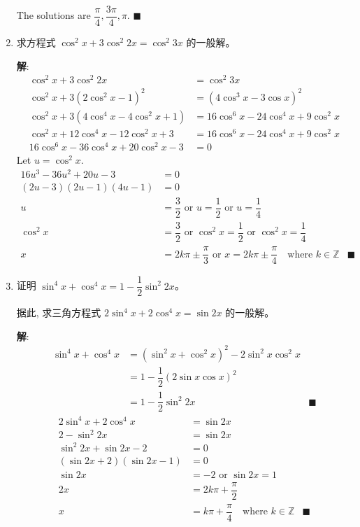 \documentclass{report}
\newcommand{\sol}{\vspace{0.2cm}\textbf{解}:}
\begin{document}
\begin{enumerate}[leftmargin=*]
    The solutions are $\dfrac{\pi}{4}, \dfrac{3\pi}{4}, \pi$. \hfill $\blacksquare$

    \newpage
    \item 求方程式 $\cos ^2 x+3 \cos ^2 2 x=\cos ^2 3 x$ 的一般解。
    
    \sol{}
    \begin{align*}
        \cos ^2 x+3 \cos ^2 2 x &= \cos ^2 3 x\\
        \cos ^2 x+3(2\cos^2 x - 1)^2 &= (4\cos^3 x - 3\cos x)^2\\
        \cos ^2 x+3(4\cos^4 x - 4\cos^2 x + 1) &= 16\cos^6 x - 24\cos^4 x + 9\cos^2 x\\
        \cos ^2 x+12\cos^4 x - 12\cos^2 x + 3 &= 16\cos^6 x - 24\cos^4 x + 9\cos^2 x\\
        16\cos^6 x - 36\cos^4 x + 20\cos^2 x - 3 &= 0
    \end{align*}
    Let $u = \cos^2 x$.
    \begin{align*}
        16u^3 - 36u^2 + 20u - 3 &= 0\\
        (2u - 3)(2u - 1)(4u - 1) &= 0\\
        u &= \dfrac{3}{2} \text{ or } u = \dfrac{1}{2} \text{ or } u = \dfrac{1}{4}\\
        \cos^2 x &= \dfrac{3}{2} \text{ or } \cos^2 x = \dfrac{1}{2} \text{ or } \cos^2 x = \dfrac{1}{4}\\
        x &= 2k\pi \pm \dfrac{\pi}{3} \text{ or } x = 2k\pi \pm \dfrac{\pi}{4} \quad \text{where } k \in \mathbb{Z} & \blacksquare
    \end{align*}

    \item 证明 $\sin ^4 x+\cos ^4 x=1-\dfrac{1}{2} \sin ^2 2 x$。

    据此, 求三角方程式 $2 \sin ^4 x+2 \cos ^4 x=\sin 2 x$ 的一般解。

    \sol{}
    \begin{align*}
        \sin ^4 x+\cos ^4 x &= (\sin^2 x + \cos^2 x)^2 - 2\sin^2 x\cos^2 x\\
        &= 1 - \dfrac{1}{2}(2\sin x\cos x)^2\\
        &= 1 - \dfrac{1}{2}\sin^2 2x & \blacksquare
    \end{align*}
    \begin{align*}
        2 \sin ^4 x+2 \cos ^4 x &= \sin 2x\\
        2 - \sin^2 2x &= \sin 2x\\
        \sin^2 2x + \sin 2x - 2 &= 0\\
        (\sin 2x + 2)(\sin 2x - 1) &= 0\\
        \sin 2x &= -2 \text{ or } \sin 2x = 1\\
        2x &= 2k\pi + \dfrac{\pi}{2}\\
        x &= k\pi + \dfrac{\pi}{4} \quad \text{where } k \in \mathbb{Z} & \blacksquare
    \end{align*}
    \end{enumerate}
\end{document}
